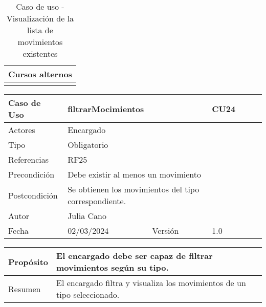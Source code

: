 \begin{table}[H]
	\centering
	\begin{tabular}{| m{} | m{} | m{} | m{} |}
		\hline
		\multicolumn{4}{|m{0.9\textwidth}|}{Cursos alternos}     \\ 
		\hline
		& \multicolumn{3}{m{0.67\textwidth}|}{} \\ 
		\hline
	\end{tabular}
	\caption{Caso de uso - Visualización de la lista de movimientos existentes}
\end{table}

\newpage


\begin{table}[H]
	\centering
	\begin{tabular}{| m{} | m{} | m{} | m{}|}
		\hline
		\rowcolor{grayshade} Caso de Uso & \multicolumn{2}{|m{0.43\textwidth}|}{filtrarMocimientos} &  CU24\\ 
		\hline
		Actores & \multicolumn{3}{l|}{Encargado} \\ 
		\hline
		Tipo & \multicolumn{3}{l|}{Obligatorio} \\ 
		\hline
		Referencias & \multicolumn{3}{l|}{RF25} \\ 
		\hline
		Precondición & \multicolumn{3}{m{0.67\textwidth}|}{Debe existir al menos un movimiento} \\ 
		\hline
		Postcondición & \multicolumn{3}{m{0.67\textwidth}|}{Se obtienen los movimientos del tipo correspondiente.} \\ 
		\hline
		Autor & \multicolumn{3}{l|}{Julia Cano} \\ 
		\hline
		Fecha & 02/03/2024 & Versión & 1.0 \\
		\hline
	\end{tabular}
\end{table}

\begin{table}[H]
	\centering
	\begin{tabular}{| m{} | m{} | m{} | m{} |}
		\hline
		Propósito & \multicolumn{3}{m{0.67\textwidth}|}{El encargado debe ser capaz de filtrar movimientos según su tipo.}  \\ 
		\hline
		Resumen & \multicolumn{3}{m{0.67\textwidth}|}{El encargado filtra y visualiza los movimientos de un tipo seleccionado.} \\ 
		\hline
	\end{tabular}
\end{table}


